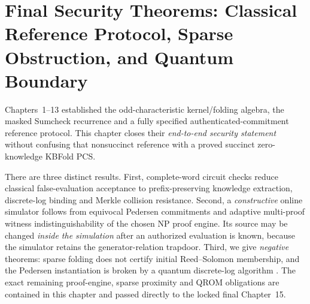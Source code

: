 \section{Final Security Theorems: Classical Reference Protocol, Sparse Obstruction, and Quantum Boundary}\label{sec:security14}
Chapters~1--13 established the odd-characteristic
kernel/folding algebra, the masked Sumcheck
recurrence and a fully specified
authenticated-commitment reference
protocol. This chapter closes their
\emph{end-to-end security statement}
without confusing that nonsuccinct
reference with a proved succinct
zero-knowledge KBFold PCS.

There are three distinct results.
First, complete-word circuit checks
reduce classical false-evaluation
acceptance to prefix-preserving
knowledge extraction, discrete-log
binding and Merkle collision
resistance. Second, a \emph{constructive}
online simulator follows from
equivocal Pedersen commitments and
adaptive multi-proof witness
indistinguishability of the chosen
NP proof engine. Its source may be
changed \emph{inside the simulation}
after an authorized evaluation is
known, because the simulator retains
the generator-relation trapdoor.
Third, we give \emph{negative}
theorems: sparse folding does not
certify initial Reed--Solomon
membership, and the Pedersen
instantiation is broken by a
quantum discrete-log algorithm
\cite{Shor1997}.
The exact remaining proof-engine,
sparse proximity and QROM
obligations are contained in
this chapter and passed directly
to the locked final Chapter~15.








